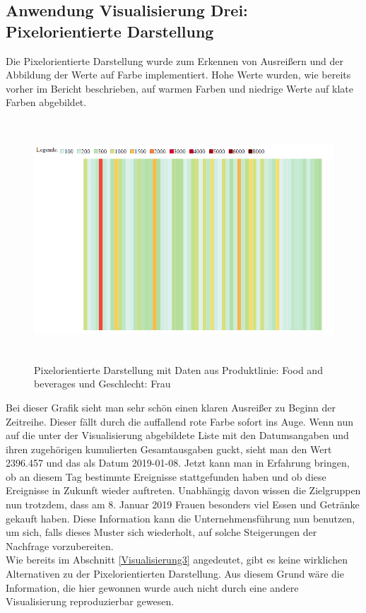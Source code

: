 \documentclass[usegeometry=true]{scrartcl}
\begin{document}
\subsection{Anwendung Visualisierung Drei: Pixelorientierte Darstellung}
Die Pixelorientierte Darstellung wurde zum Erkennen von Ausreißern und der Abbildung der Werte auf Farbe implementiert. Hohe Werte wurden, wie bereits vorher im Bericht
beschrieben, auf warmen Farben und niedrige Werte auf klate Farben abgebildet.

\begin{figure} [H]
	\begin{center}
		\includegraphics[height=9cm]{IMG/PixelFoodFrau.png}
		\caption{Pixelorientierte Darstellung mit Daten aus Produktlinie: Food and beverages und Geschlecht: Frau}
		\label{fig:PixelFoodFrau}
	\end{center}
\end{figure}

\noindent Bei dieser Grafik sieht man sehr schön einen klaren Ausreißer zu Beginn der Zeitreihe. Dieser fällt durch die auffallend rote Farbe sofort ins Auge.
Wenn nun auf die unter der Visualisierung abgebildete Liste mit den Datumsangaben und ihren zugehörigen kumulierten Gesamtausgaben guckt, sieht man den Wert 2396.457 und
das als Datum 2019-01-08. Jetzt kann man in Erfahrung bringen, ob an diesem Tag bestimmte Ereignisse stattgefunden haben und ob diese Ereignisse in Zukunft wieder auftreten.
Unabhängig davon wissen die Zielgruppen nun trotzdem, dass am 8. Januar 2019 Frauen besonders viel Essen und Getränke gekauft haben. Diese Information kann die Unternehmensführung
nun benutzen, um sich, falls dieses Muster sich wiederholt, auf solche Steigerungen der Nachfrage vorzubereiten.\\
\noindent Wie bereits im Abschnitt \ref{Visualisierung3} angedeutet, gibt es keine wirklichen Alternativen zu der Pixelorientierten Darstellung. Aus diesem Grund wäre die
Information, die hier gewonnen wurde auch nicht durch eine andere Visualisierung reproduzierbar gewesen.
\printbibliography
\end{document}
